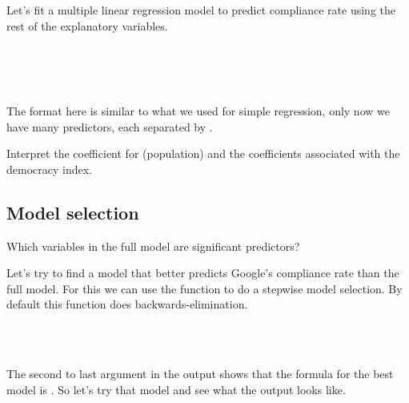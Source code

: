\documentclass[11pt]{article}
\begin{document}
Let's fit a multiple linear regression model to predict compliance rate using the rest of the explanatory variables.

\ttfamily\noindent
\hlstd{}\hspace*{\fill}\\
\hlstd{}\hlassignement{=}{\ }\hlkeyword{(}\hlkeyword{\urltilda{}}{\ }\hlkeyword{+}{\ }\hlkeyword{+}{\ }\hlkeyword{+}{\ }\hlkeyword{+}{\ }\hlkeyword{+}{\ }\hlkeyword{,}{\ }\hlargument{=}{\ }\hlkeyword{)}\hspace*{\fill}\\
\hlstd{}\hlkeyword{(}\hlkeyword{)}\hspace*{\fill}\\
\normalfont

The format here is similar to what we used for simple regression, only now we have many predictors, each separated by \texttt{\hlkeyword{+}}.

\begin{exercise}
Interpret the coefficient for \texttt{} (population) and the coefficients associated with the democracy index.
\end{exercise}

\subsection*{Model selection}

\begin{exercise}
Which variables in the full model are significant predictors?
\end{exercise}

Let's try to find a model that better predicts Google's compliance rate than the full model. For this we can use the \texttt{} function to do a stepwise model selection. By default this function does backwards-elimination.

\ttfamily\noindent
\hlstd{}\hspace*{\fill}\\
\hlstd{}\hlkeyword{(}\hlkeyword{)}\hspace*{\fill}\\
\normalfont

The second to last argument in the output shows that the formula for the best model is \texttt{\hlkeyword{(}\hlkeyword{\urltilda{}}{\ }{\ }\hlkeyword{+}{\ }\hlkeyword{,}{\ }\hlargument{=}{\ }\hlkeyword{)}}. So let's try that model and see what the output looks like.
\end{document}
